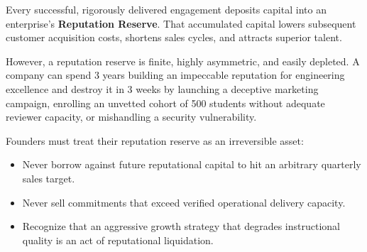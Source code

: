 Every successful, rigorously delivered engagement deposits capital into an enterprise's \textbf{Reputation Reserve}. That accumulated capital lowers subsequent customer acquisition costs, shortens sales cycles, and attracts superior talent. 

However, a reputation reserve is finite, highly asymmetric, and easily depleted. A company can spend 3 years building an impeccable reputation for engineering excellence and destroy it in 3 weeks by launching a deceptive marketing campaign, enrolling an unvetted cohort of 500 students without adequate reviewer capacity, or mishandling a security vulnerability.

Founders must treat their reputation reserve as an irreversible asset:
\begin{itemize}
\item Never borrow against future reputational capital to hit an arbitrary quarterly sales target.
\item Never sell commitments that exceed verified operational delivery capacity.
\item Recognize that an aggressive growth strategy that degrades instructional quality is an act of reputational liquidation.
\end{itemize}
